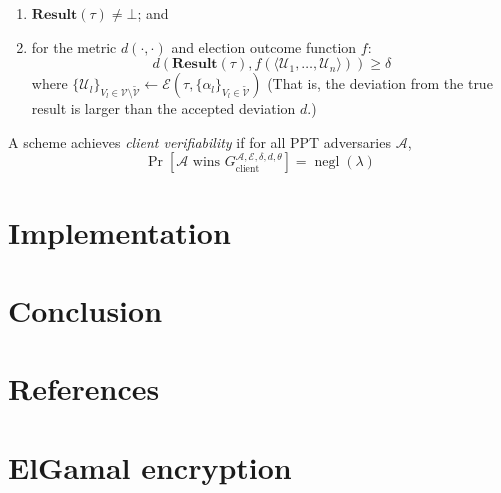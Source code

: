 \documentclass[12pt,a4paper]{article}
\DeclareMathOperator{\negl}{\text{negl}}
\theoremstyle{definition}
\begin{document}
\begin{definition}
\begin{enumerate}
        \item $\mathbf{Result}(\tau) \neq \bot$; and
        \item for the metric $d(\cdot, \cdot)$ and election outcome function $f$:
                    $$d(\mathbf{Result}(\tau), f(\langle\mathcal{U}_1,\ldots,\mathcal{U}_n\rangle)) \geq \delta$$
            where $\{\mathcal{U}_l\}_{V_l \in \mathcal{V} \setminus \tilde{\mathcal{V}}} \leftarrow \mathcal{E}(\tau, \{\alpha_l \}_{V_l \in \tilde{\mathcal{V}}})$
            (That is, the deviation from the true result is larger than the accepted deviation $d$.)
    \end{enumerate}
    A scheme achieves \textit{client verifiability} if for all PPT adversaries $\mathcal{A}$, $$\Pr\left[\mathcal{A}\text{ wins }G_\text{client}^{\mathcal{A},\mathcal{E},\delta,d,\theta}\right]=\negl(\lambda)$$
\end{definition}
\section{Implementation}
\section{Conclusion}
\newpage
\section{References}


\newpage
\appendix
\section{ElGamal encryption}\label{app-elgamal}
\end{document}
